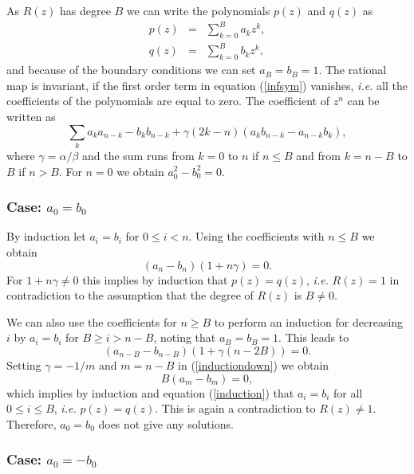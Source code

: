 \documentclass[a4paper,12pt]{article}
\begin{document}
As $R(z)$ has degree $B$ we can write the polynomials $p(z)$ and $q(z)$ as
%
\begin{eqnarray}
p(z) &=& \sum\limits_{k=0}^{B} a_k z^k, \\
q(z) &=& \sum\limits_{k=0}^{B} b_k z^k, 
\end{eqnarray}
%
and because of the boundary conditions we can set $a_B = b_B = 1$. 
The rational map is invariant, if the first order term in equation 
(\ref{infsym}) vanishes, {\it i.e.} all the coefficients of the polynomials are 
equal to zero. The coefficient of $z^n$ can be written as
%
\begin{equation}
\sum\limits_{k} a_k a_{n-k} - b_k b_{n-k} + \gamma (2k-n) (a_k b_{n-k} - a_{n-k} 
b_k),
\end{equation}
%
where $\gamma = \alpha / \beta$ and the sum runs from $k=0$ to $n$ if $n \leq B$ 
and from $k = n-B$ to $B$ if $n > B$. For $n=0$ we obtain $a_0^2 - b_0^2 = 0$.

\subsubsection*{Case: $a_0 = b_0$}

By induction let $a_i = b_i$ for $0 \leq i < n$. 
Using the coefficients with $n \leq B$ we obtain
%
\begin{equation}
\label{induction}
(a_n - b_n)(1 + n \gamma) = 0.
\end{equation}
%
For $1 + n \gamma \neq 0$ this implies by induction that $p(z) = q(z)$, 
{\it i.e.} 
$R(z) = 1$ in contradiction to the assumption that the degree of $R(z)$ is 
$B\neq 0$.

We can also use the coefficients for $n \geq B$ to  
perform an induction for decreasing 
$i$ by $a_i = b_i$ for $B \geq i > n-B$, noting that $a_B = b_B = 1$. This leads 
to
%
\begin{equation}
\label{inductiondown}
(a_{n-B} - b_{n-B})(1 + \gamma (n - 2B)) = 0.
\end{equation}
%
Setting $\gamma = -1/m$ and $m = n-B$ in (\ref{inductiondown}) we obtain
%
\begin{equation}
B(a_m - b_m) = 0,
\end{equation}
%
which implies by induction and equation (\ref{induction}) that
$a_i = b_i$ for all $0 \leq i \leq B$, {\it i.e.} $p(z) = q(z)$. This  is 
again a contradiction to $R(z) \neq 1$. Therefore, $a_0=b_0$ does not give any 
solutions.

\subsubsection*{Case: $a_0 = -b_0$}
\end{document}
